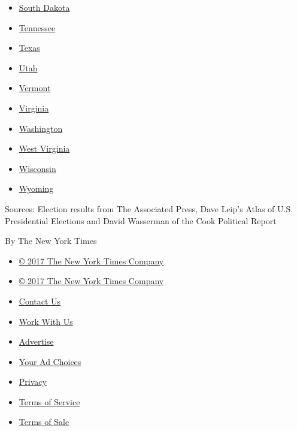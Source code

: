 \begin{itemize}
{  Carolina}
\item
  \href{//www.nytimes3xbfgragh.onion/elections/2016/results/south-dakota}{South
  Dakota}
\item
  \href{//www.nytimes3xbfgragh.onion/elections/2016/results/tennessee}{Tennessee}
\item
  \href{//www.nytimes3xbfgragh.onion/elections/2016/results/texas}{Texas}
\item
  \href{//www.nytimes3xbfgragh.onion/elections/2016/results/utah}{Utah}
\item
  \href{//www.nytimes3xbfgragh.onion/elections/2016/results/vermont}{Vermont}
\item
  \href{//www.nytimes3xbfgragh.onion/elections/2016/results/virginia}{Virginia}
\item
  \href{//www.nytimes3xbfgragh.onion/elections/2016/results/washington}{Washington}
\item
  \href{//www.nytimes3xbfgragh.onion/elections/2016/results/west-virginia}{West
  Virginia}
\item
  \href{//www.nytimes3xbfgragh.onion/elections/2016/results/wisconsin}{Wisconsin}
\item
  \href{//www.nytimes3xbfgragh.onion/elections/2016/results/wyoming}{Wyoming}
\end{itemize}

Sources: Election results from The Associated Press, Dave Leip's Atlas
of U.S. Presidential Elections and David Wasserman of the Cook Political
Report

By The New York Times

\begin{itemize}
\tightlist
\item
  \href{//www.nytco.com}{© 2017 The New York Times Company}
\end{itemize}

\begin{itemize}
\tightlist
\item
  \href{//www.nytco.com}{© 2017 The New York Times Company}
\item
  \href{//www.nytimes3xbfgragh.onion/ref/membercenter/help/infoservdirectory.html}{Contact
  Us}
\item
  \href{//www.nytco.com/careers}{Work With Us}
\item
  \href{//www.nytimes.whsites.net/mediakit}{Advertise}
\item
  \href{//www.nytimes3xbfgragh.onion/content/help/rights/privacy/policy/privacy-policy.html\#pp}{Your
  Ad Choices}
\item
  \href{//www.nytimes3xbfgragh.onion/privacy}{Privacy}
\item
  \href{//www.nytimes3xbfgragh.onion/ref/membercenter/help/agree.html}{Terms
  of Service}
\item
  \href{//www.nytimes3xbfgragh.onion/content/help/rights/sale/terms-of-sale.html}{Terms
  of Sale}
\end{itemize}

